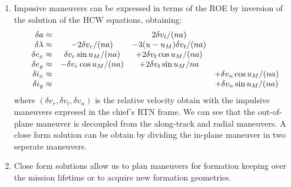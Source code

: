 \documentclass[a4paper]{article}
\begin{document}
\begin{enumerate}[label=\emph{\alph*)}]
  \item %
    Impusive maneuvers can be expressed in terms of the ROE by inversion of the solution of the HCW equations, obtaining:
    \[ \begin{array}{r c c c}
      \delta a \approx & & 2 \delta v_t/(na) & \\    
      \delta \lambda \approx & -2\delta v_r/(na) & -3(u-u_M)\delta v_t/(na) & \\
      \delta e_x \approx & \delta v_r \sin{u_M}/(na) & +2\delta v_t\cos{u_M}/(na) & \\
      \delta e_y \approx & -\delta v_r \cos{u_M}/(na) & +2\delta v_t \sin{u_M}/{na} & \\
      \delta i_x \approx & & & +\delta v_n \cos{u_M}/(na) \\
      \delta i_y \approx & & & +\delta v_n \sin{u_M}/(na) 
  \end{array}\]
  where $(\delta v_r,\delta v_t,\delta v_n)$ is the relative velocity obtain with the impulsive maneuvers expresed in the chief's RTN frame. We can see that the out-of-plane maneuver is decoupled from the along-track and radial maneuvers. A close form solution can be obtain by dividing the in-plane maneuver in two seperate maneuvers.


  \item %
    Close form solutions allow us to plan maneuvers for formation keeping over the mission lifetime or to acquire new formation geometries.


\end{enumerate}
\end{document}
